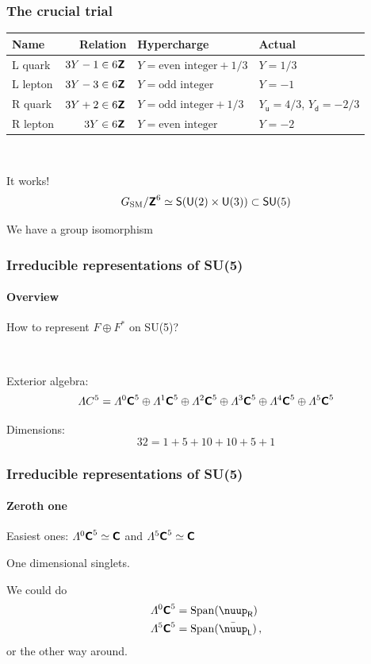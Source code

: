 \documentclass[english, fleqn]{beamer}
\DeclareMathOperator\Span{Span}
\begin{document}
\begin{frame}
    \frametitle{The crucial trial}
    
    \begin{tabular}{lrll}
        \toprule
        Name & Relation & Hypercharge & Actual \\
        \midrule
        L quark & $3Y -1 \in 6 \text{\bfseries\sffamily{Z}}$ & $Y = \text{even integer} + 1/3$ & $Y = 1/3$ \\
        L lepton & $3Y -3 \in 6 \text{\bfseries\sffamily{Z}}$ & $Y = \text{odd integer}$ & $Y = -1$ \\
        R quark & $3Y +2 \in 6 \text{\bfseries\sffamily{Z}}$ & $Y = \text{odd integer} + 1/3$ & $Y_\mathsf u = 4/3$, $Y_\mathsf d = -2/3$ \\
        R lepton & $3Y \in 6 \text{\bfseries\sffamily{Z}}$ & $Y = \text{even integer}$ & $Y = -2$ \\
        \bottomrule
    \end{tabular}

    \

    \pause

    It works!
    \[
        G_\text{SM} / \text{\bfseries\sffamily{Z}}^6 \simeq \mathsf S(\mathsf U(2) \times \mathsf U(3)) \subset \mathsf{SU}(5)
    \]

    We have a group isomorphism
\end{frame}

\begin{frame}
    \frametitle{Irreducible representations of SU(5)}
    \framesubtitle{Overview}

    How to represent $F \oplus F^*$ on SU(5)?

    \

    Exterior algebra:
    \[
        \Lambda C^5 = 
                \Lambda^0 \text{\bfseries\sffamily{C}}^5
                \oplus \Lambda^1 \text{\bfseries\sffamily{C}}^5
                \oplus \Lambda^2 \text{\bfseries\sffamily{C}}^5
                \oplus \Lambda^3 \text{\bfseries\sffamily{C}}^5
                \oplus \Lambda^4 \text{\bfseries\sffamily{C}}^5
                \oplus \Lambda^5 \text{\bfseries\sffamily{C}}^5
    \]

    Dimensions:
    \[
        32 = 1 + 5 + 10 + 10 + 5 + 1
    \]
\end{frame}

\begin{frame}
    \frametitle{Irreducible representations of SU(5)}
    \framesubtitle{Zeroth one}

    Easiest ones: $\Lambda^0 \text{\bfseries\sffamily{C}}^5 \simeq \text{\bfseries\sffamily{C}}$ and $\Lambda^5 \text{\bfseries\sffamily{C}}^5 \simeq \text{\bfseries\sffamily{C}}$

    One dimensional singlets.

    We could do
    \begin{align*}
        \Lambda^0 \C^5 &= \Span(\nuup_\mathsf R) \\
        \Lambda^5 \C^5 &= \Span(\bar \nuup_\mathsf L) \,,
    \end{align*}
    or the other way around.
\end{frame}
\end{document}
